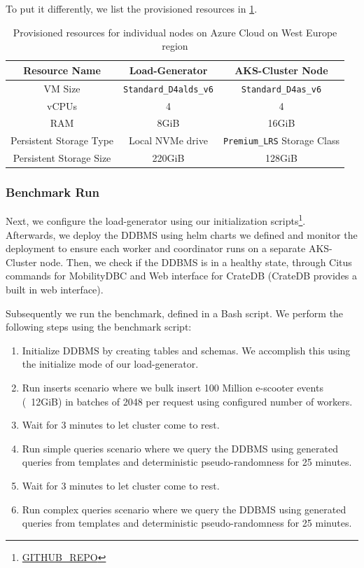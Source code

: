 To put it differently, we list the provisioned resources in \cref{tab:node-resources}.

\begin{table}[ht]
  \centering
  \begin{tabular}{|c|c|c|}
    \hline
    Resource Name & Load-Generator & AKS-Cluster Node \\
    \hline
    VM Size & \verb|Standard_D4alds_v6| & \verb|Standard_D4as_v6| \\
    vCPUs & 4 & 4 \\
    RAM & 8GiB & 16GiB \\
    Persistent Storage Type & Local NVMe drive & \verb|Premium_LRS| Storage Class \\
    Persistent Storage Size & 220GiB & 128GiB \\
    \hline
  \end{tabular}
  \caption{Provisioned resources for individual nodes on Azure Cloud on West Europe region}
  \label{tab:node-resources}
\end{table}

\subsubsection{Benchmark Run}

Next, we configure the load-generator using our initialization scripts\footnote{\url{GITHUB_REPO}}.
Afterwards, we deploy the DDBMS using helm charts we defined and monitor the deployment to ensure each worker and coordinator runs on a separate AKS-Cluster node.
Then, we check if the DDBMS is in a healthy state, through Citus commands for MobilityDBC and Web interface for CrateDB (CrateDB provides a built in web interface).

Subsequently we run the benchmark, defined in a Bash script.
We perform the following steps using the benchmark script:
\begin{enumerate}
  \item Initialize DDBMS by creating tables and schemas. We accomplish this using the initialize mode of our load-generator.
  \item Run inserts scenario where we bulk insert 100 Million e-scooter events (~12GiB) in batches of 2048 per request using configured number of workers.
  \item Wait for 3 minutes to let cluster come to rest.
  \item Run simple queries scenario where we query the DDBMS using generated queries from templates and deterministic pseudo-randomness for 25 minutes.
  \item Wait for 3 minutes to let cluster come to rest.
  \item Run complex queries scenario where we query the DDBMS using generated queries from templates and deterministic pseudo-randomness for 25 minutes.
\end{enumerate}

